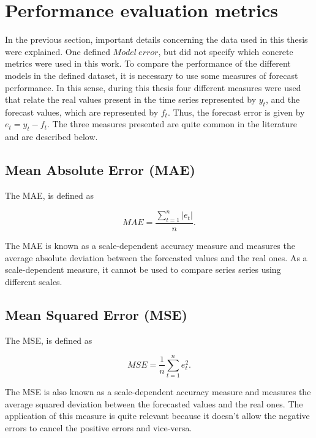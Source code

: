 \section{Performance evaluation metrics}\label{chap5:evaluation}

In the previous section, important details concerning the data used in this thesis were explained. One defined $Model\ error$, but did not specify which concrete metrics were used in this work. To compare the performance of the different models in the defined dataset, it is necessary to use some measures of forecast performance. In this sense, during this thesis four different measures were used that relate the real values present in the time series represented by $y_t$, and the forecast values, which are represented by $f_t$. Thus, the forecast error is given by $e_t=y_t-f_t$. The three measures presented are quite common in the literature \cite{} and are described below.

\subsection{Mean Absolute Error (MAE)}

The \ac{MAE}, is defined as

\begin{equation}
     MAE =\frac {\sum_{t=1}^n|e_t|}{n}.
\label{mae}
\end{equation}

The \ac{MAE} is known as a scale-dependent accuracy measure and measures the average absolute deviation between the forecasted values and the real ones. As a scale-dependent measure, it cannot be used to compare series series using different scales.


\subsection{Mean Squared Error (MSE)}

The \ac{MSE}, is defined as

\begin{equation}
     MSE =\frac {1}{n}\sum_{t=1}^ne_t^2.
\label{mse}
\end{equation}

The \ac{MSE} is also known as a scale-dependent accuracy measure and measures the average squared deviation between the forecasted values and the real ones. The application of this measure is quite relevant because it doesn't allow the negative errors to cancel the positive errors and vice-versa. 

